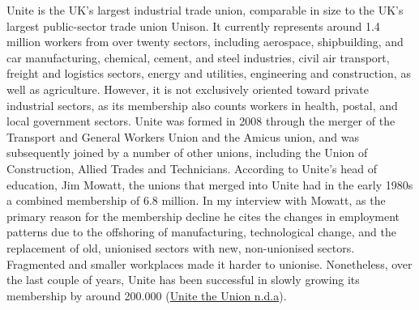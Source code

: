 \documentclass[a4paper, nobind]{templates/ociamthesis}
\begin{document}
Unite is the UK's largest industrial trade union, comparable in size to the UK's largest public-sector trade union Unison. It currently represents around 1.4 million workers from over twenty sectors, including aerospace, shipbuilding, and car manufacturing, chemical, cement, and steel industries, civil air transport, freight and logistics sectors, energy and utilities, engineering and construction, as well as agriculture. However, it is not exclusively oriented toward private industrial sectors, as its membership also counts workers in health, postal, and local government sectors. Unite was formed in 2008 through the merger of the Transport and General Workers Union and the Amicus union, and was subsequently joined by a number of other unions, including the Union of Construction, Allied Trades and Technicians. According to Unite's head of education, Jim Mowatt, the unions that merged into Unite had in the early 1980s a combined membership of 6.8 million. In my interview with Mowatt, as the primary reason for the membership decline he cites the changes in employment patterns due to the offshoring of manufacturing, technological change, and the replacement of old, unionised sectors with new, non-unionised sectors. Fragmented and smaller workplaces made it harder to unionise. Nonetheless, over the last couple of years, Unite has been successful in slowly growing its membership by around 200.000 (\protect\hyperlink{ref-unite_the_union_community_}{Unite the Union n.d.a}).
\end{document}
